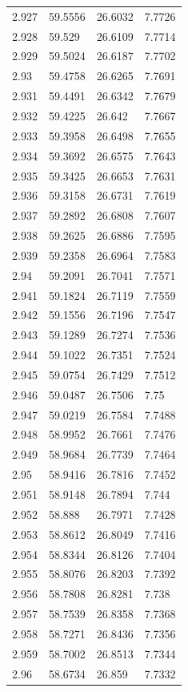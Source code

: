 \begin{tabular}{llll}
2.927 & 59.5556 & 26.6032 & 7.7726 \\
2.928 & 59.529 & 26.6109 & 7.7714 \\
2.929 & 59.5024 & 26.6187 & 7.7702 \\
2.93 & 59.4758 & 26.6265 & 7.7691 \\
2.931 & 59.4491 & 26.6342 & 7.7679 \\
2.932 & 59.4225 & 26.642 & 7.7667 \\
2.933 & 59.3958 & 26.6498 & 7.7655 \\
2.934 & 59.3692 & 26.6575 & 7.7643 \\
2.935 & 59.3425 & 26.6653 & 7.7631 \\
2.936 & 59.3158 & 26.6731 & 7.7619 \\
2.937 & 59.2892 & 26.6808 & 7.7607 \\
2.938 & 59.2625 & 26.6886 & 7.7595 \\
2.939 & 59.2358 & 26.6964 & 7.7583 \\
2.94 & 59.2091 & 26.7041 & 7.7571 \\
2.941 & 59.1824 & 26.7119 & 7.7559 \\
2.942 & 59.1556 & 26.7196 & 7.7547 \\
2.943 & 59.1289 & 26.7274 & 7.7536 \\
2.944 & 59.1022 & 26.7351 & 7.7524 \\
2.945 & 59.0754 & 26.7429 & 7.7512 \\
2.946 & 59.0487 & 26.7506 & 7.75 \\
2.947 & 59.0219 & 26.7584 & 7.7488 \\
2.948 & 58.9952 & 26.7661 & 7.7476 \\
2.949 & 58.9684 & 26.7739 & 7.7464 \\
2.95 & 58.9416 & 26.7816 & 7.7452 \\
2.951 & 58.9148 & 26.7894 & 7.744 \\
2.952 & 58.888 & 26.7971 & 7.7428 \\
2.953 & 58.8612 & 26.8049 & 7.7416 \\
2.954 & 58.8344 & 26.8126 & 7.7404 \\
2.955 & 58.8076 & 26.8203 & 7.7392 \\
2.956 & 58.7808 & 26.8281 & 7.738 \\
2.957 & 58.7539 & 26.8358 & 7.7368 \\
2.958 & 58.7271 & 26.8436 & 7.7356 \\
2.959 & 58.7002 & 26.8513 & 7.7344 \\
2.96 & 58.6734 & 26.859 & 7.7332 \\

\end{tabular}
